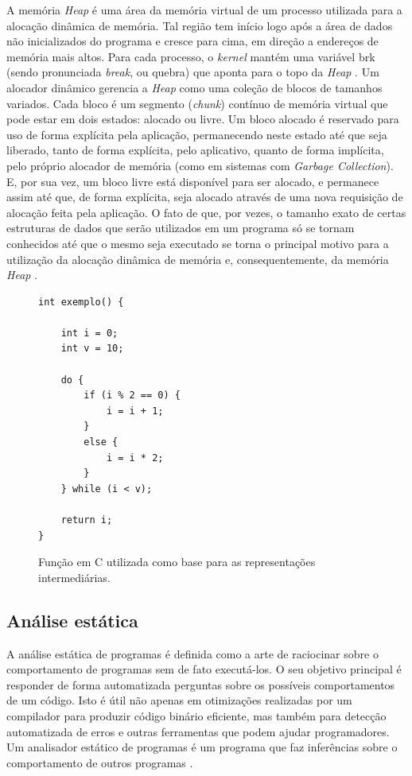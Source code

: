 \documentclass[
    12pt,                %
    openright,           %
    oneside,             %
    a4paper,             %
    english,             %
    brazil               %
]{abntex2}
\begin{document}
A memória \textit{Heap} é uma área da memória virtual de um processo utilizada para a alocação dinâmica de memória. Tal região tem início logo após a área de dados não inicializados do programa e cresce para cima, 
em direção a endereços de memória mais altos. Para cada processo, o \textit{kernel} mantém uma variável brk (sendo pronunciada \textit{break}, ou quebra) que aponta para o topo da \textit{Heap} \cite{Bryant2010}. 
Um alocador dinâmico gerencia a \textit{Heap} como uma coleção de blocos de tamanhos variados. Cada bloco é um segmento (\textit{chunk}) contínuo de memória virtual que pode estar em dois estados: alocado ou livre. 
Um bloco alocado é reservado para uso de forma explícita pela aplicação, permanecendo neste estado até que seja liberado, tanto de forma explícita, pelo aplicativo, quanto de forma implícita, pelo próprio alocador de memória (como em sistemas com \textit{Garbage Collection}). 
E, por sua vez, um bloco livre está disponível para ser alocado, e permanece assim até que, de forma explícita, seja alocado através de uma nova requisição de alocação feita pela aplicação. O fato de que, por vezes, o tamanho exato de certas estruturas de dados que 
serão utilizados em um programa só se tornam conhecidos até que o mesmo seja executado se torna o principal motivo para a utilização da alocação dinâmica de memória e, consequentemente, da memória \textit{Heap} \cite{Bryant2010}.


\begin{figure}[htpb]
\centering
\caption{Função em C utilizada como base para as representações intermediárias.}
\label{fig:codigo_exemplo}
\begin{verbatim}
int exemplo() {

    int i = 0;
    int v = 10;

    do { 
        if (i % 2 == 0) {
            i = i + 1;
        }
        else {
            i = i * 2;
        }
    } while (i < v);

    return i;
}
\end{verbatim}
\end{figure}

\subsection{Análise estática}
\label{subsec:analise_estatica}

\par
A análise estática de programas é definida como a arte de raciocinar sobre o comportamento de programas sem de fato executá-los. O seu objetivo principal é responder de forma automatizada perguntas sobre os possíveis comportamentos de um código. 
Isto é útil não apenas em otimizações realizadas por um compilador para produzir código binário eficiente, mas também para detecção automatizada de erros e outras ferramentas que podem ajudar programadores. Um analisador estático de programas é um programa que faz inferências sobre o comportamento de outros programas \cite{spa}.
\end{document}
